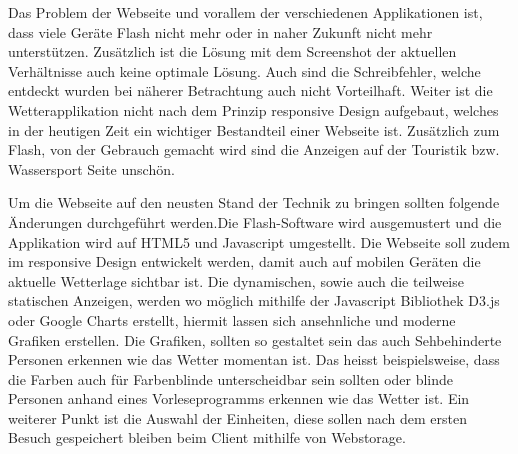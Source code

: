 Das Problem der Webseite und vorallem der verschiedenen Applikationen ist, dass viele Geräte Flash nicht mehr oder in naher Zukunft nicht mehr unterstützen. Zusätzlich ist die Lösung mit dem Screenshot der aktuellen Verhältnisse auch keine optimale Lösung. Auch sind die Schreibfehler, welche entdeckt wurden bei näherer Betrachtung auch nicht Vorteilhaft. Weiter ist die Wetterapplikation nicht nach dem Prinzip responsive Design aufgebaut, welches in der heutigen Zeit ein wichtiger Bestandteil einer Webseite ist. Zusätzlich zum Flash, von der Gebrauch gemacht wird sind die Anzeigen auf der Touristik bzw. Wassersport Seite unschön. 

Um die Webseite auf den neusten Stand der Technik zu bringen sollten folgende Änderungen durchgeführt werden.Die Flash-Software wird ausgemustert und die Applikation wird auf HTML5 und Javascript umgestellt. Die Webseite soll zudem im responsive Design entwickelt werden, damit auch auf mobilen Geräten die aktuelle Wetterlage sichtbar ist. Die dynamischen, sowie auch die teilweise statischen Anzeigen, werden wo möglich mithilfe der Javascript Bibliothek D3.js oder Google Charts erstellt, hiermit lassen sich ansehnliche und moderne Grafiken erstellen. Die Grafiken, sollten so gestaltet sein das auch Sehbehinderte Personen erkennen wie das Wetter momentan ist. Das heisst beispielsweise, dass die Farben auch für Farbenblinde unterscheidbar sein sollten oder blinde Personen anhand eines Vorleseprogramms erkennen wie das Wetter ist. Ein weiterer Punkt ist die Auswahl der Einheiten, diese sollen nach dem ersten Besuch gespeichert bleiben beim Client mithilfe von Webstorage.
